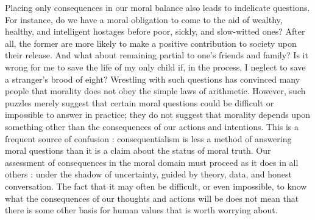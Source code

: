 \documentclass[a4paper,14pt]{extbook}
\begin{document}
Placing only consequences in our moral balance also leads to indelicate questions.
For instance, do we have a moral obligation to come to the aid of wealthy, healthy, and intelligent hostages before poor, sickly, and slow-witted ones?
After all, the former are more likely to make a positive contribution to society upon their release.
And what about remaining partial to one's friends and family?
Is it wrong for me to save the life of my only child if, in the process, I neglect to save a stranger's brood of eight?
Wrestling with such questions has convinced many people that morality does not obey the simple laws of arithmetic.
However, such puzzles merely suggest that certain moral questions could be difficult or impossible to answer in practice;
they do not suggest that morality depends upon something other than the consequences of our actions and intentions.
This is a frequent source of confusion :
consequentialism is less a method of answering moral questions than it is a claim about the status of moral truth.
Our assessment of consequences in the moral domain must proceed as it does in all others :
under the shadow of uncertainty, guided by theory, data, and honest conversation.
The fact that it may often be difficult, or even impossible, to know what the consequences of our thoughts and actions will be does not mean that there is some other basis for human values that is worth worrying about.
\end{document}
